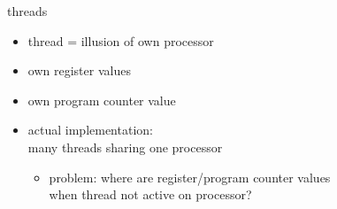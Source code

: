 \begin{frame}{threads}
\begin{itemize}
\item thread = illusion of own processor
\vspace{.5cm}
\item own register values
\item own program counter value
\vspace{.5cm}
\item<2-> actual implementation: \\
    many threads sharing one processor
    \begin{itemize}
    \item problem: where are register/program counter values \\
        when thread not active on processor?
    \end{itemize}
\end{itemize}
\end{frame}
